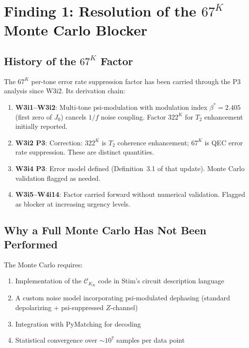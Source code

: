 \documentclass[11pt]{article}
\theoremstyle{definition}
\theoremstyle{remark}
\newcommand{\CK}{\mathcal{C}_K}
\begin{document}
\begin{tcolorbox}[colback=red!5!white, colframe=red!60!black,
  title=\textbf{INCONSISTENCIES AND FLAGS}]
\begin{enumerate}[nosep]
\end{enumerate}
\end{tcolorbox}

\newpage

\section{Finding 1: Resolution of the $67^K$ Monte Carlo Blocker}
\label{sec:67K-resolution}

\subsection{History of the $67^K$ Factor}
\label{sec:67K-history}

The $67^K$ per-tone error rate suppression factor has been carried
through the P3 analysis since W3i2.  Its derivation chain:

\begin{enumerate}
  \item \textbf{W3i1--W3i2}: Multi-tone psi-modulation with modulation
    index $\beta^* = 2.405$ (first zero of $J_0$) cancels $1/f$ noise
    coupling.  Factor $322^K$ for $T_2$ enhancement initially reported.
  \item \textbf{W3i2 P3}: Correction: $322^K$ is $T_2$ coherence
    enhancement; $67^K$ is QEC error rate suppression.  These are
    distinct quantities.
  \item \textbf{W3i4 P3}: Error model defined (Definition~3.1 of that
    update).  Monte Carlo validation flagged as needed.
  \item \textbf{W3i5--W4i14}: Factor carried forward without numerical
    validation.  Flagged as blocker at increasing urgency levels.
\end{enumerate}

\subsection{Why a Full Monte Carlo Has Not Been Performed}
\label{sec:why-no-mc}

The Monte Carlo requires:
\begin{enumerate}
  \item Implementation of the $\CK_K$ code in Stim's circuit description
    language
  \item A custom noise model incorporating psi-modulated dephasing
    (standard depolarizing + psi-suppressed $Z$-channel)
  \item Integration with PyMatching for decoding
  \item Statistical convergence over $\sim 10^7$ samples per data point
\end{enumerate}
\end{document}
